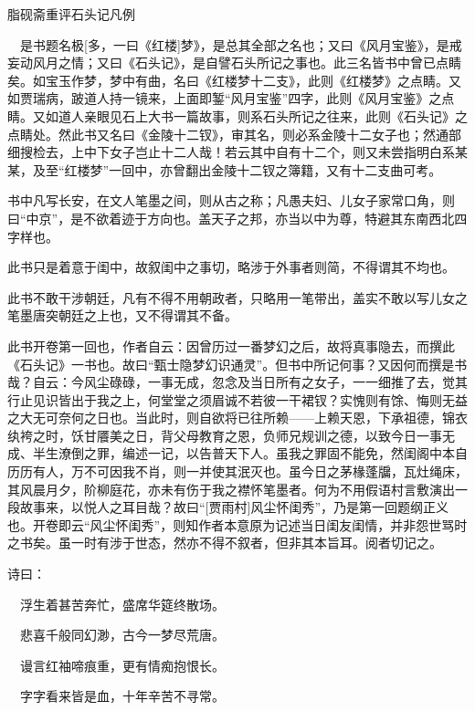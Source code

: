 \newpage

\begin{center}
	{\Huge \heiti 脂砚斋重评石头记凡例}
\end{center}



{　是书题名极{[}多，一曰《红楼]\kaishu 梦》，是总其全部之名也；又曰《风月宝鉴》，是戒妄动风月之情；又曰《石头记》，是自譬石头所记之事也。此三名皆书中曾已点睛矣。如宝玉作梦，梦中有曲，名曰《红楼梦十二支》，此则《红楼梦》之点睛。又如贾瑞病，跛道人持一镜来，上面即錾“风月宝鉴”四字，此则《风月宝鉴》之点睛。又如道人亲眼见石上大书一篇故事，则系石头所记之往来，此则《石头记》之点睛处。然此书又名曰《金陵十二钗》，审其名，则必系金陵十二女子也；然通部细搜检去，上中下女子岂止十二人哉！若云其中自有十二个，则又未尝指明白系某某，及至“红楼梦”一回中，亦曾翻出金陵十二钗之簿籍，又有十二支曲可考。}

{\kaishu 书中凡写长安，在文人笔墨之间，则从古之称；凡愚夫妇、儿女子家常口角，则曰“中京”，是不欲着迹于方向也。盖天子之邦，亦当以中为尊，特避其东南西北四字样也。}

{\kaishu 此书只是着意于闺中，故叙闺中之事切，略涉于外事者则简，不得谓其不均也。}

{\kaishu 此书不敢干涉朝廷，凡有不得不用朝政者，只略用一笔带出，盖实不敢以写儿女之笔墨唐突朝廷之上也，又不得谓其不备。}

{\kaishu 此书开卷第一回也，作者自云：因曾历过一番梦幻之后，故将真事隐去，而撰此《石头记》一书也。故曰“甄士隐梦幻识通灵”。但书中所记何事？又因何而撰是书哉？自云：今风尘碌碌，一事无成，忽念及当日所有之女子，一一细推了去，觉其行止见识皆出于我之上，何堂堂之须眉诚不若彼一干裙钗？实愧则有馀、悔则无益之大无可奈何之日也。当此时，则自欲将已往所赖------上赖天恩，下承祖德，锦衣纨袴之时，饫甘餍美之日，背父母教育之恩，负师兄规训之德，以致今日一事无成、半生潦倒之罪，编述一记，以告普天下人。虽我之罪固不能免，然闺阁中本自历历有人，万不可因我不肖，则一并使其泯灭也。虽今日之茅椽蓬牖，瓦灶绳床，其风晨月夕，阶柳庭花，亦未有伤于我之襟怀笔墨者。何为不用假语村言敷演出一段故事来，以悦人之耳目哉？故曰“{[}贾雨村{]}风尘怀闺秀”，乃是第一回题纲正义也。开卷即云“风尘怀闺秀”，则知作者本意原为记述当日闺友闺情，并非怨世骂时之书矣。虽一时有涉于世态，然亦不得不叙者，但非其本旨耳。阅者切记之。}

{\kaishu 诗曰：}

{\kaishu 　浮生着甚苦奔忙，盛席华筵终散场。}

{\kaishu 　悲喜千般同幻渺，古今一梦尽荒唐。}

{\kaishu 　谩言红袖啼痕重，更有情痴抱恨长。}

{\kaishu 　字字看来皆是血，十年辛苦不寻常。}

